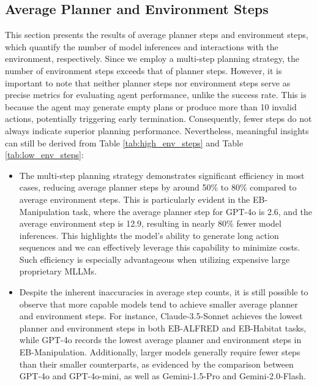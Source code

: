 \subsection{Average Planner and Environment Steps}\label{ap:planner_env_steps}
This section presents the results of average planner steps and environment steps, which quantify the number of model inferences and interactions with the environment, respectively. Since we employ a multi-step planning strategy, the number of environment steps exceeds that of planner steps. However, it is important to note that neither planner steps nor environment steps serve as precise metrics for evaluating agent performance, unlike the success rate. This is because the agent may generate empty plans or produce more than 10 invalid actions, potentially triggering early termination. Consequently, fewer steps do not always indicate superior planning performance. Nevertheless, meaningful insights can still be derived from Table \ref{tab:high_env_steps} and Table \ref{tab:low_env_steps}:
\begin{itemize}
    \item The multi-step planning strategy demonstrates significant efficiency in most cases, reducing average planner steps by around 50\% to 80\% compared to average environment steps. This is particularly evident in the EB-Manipulation task, where the average planner step for GPT-4o is 2.6, and the average environment step is 12.9, resulting in nearly 80\% fewer model inferences. This highlights the model's ability to generate long action sequences and we can effectively leverage this capability to minimize costs. Such efficiency is especially advantageous when utilizing expensive large proprietary MLLMs.
    \item Despite the inherent inaccuracies in average step counts, it is still possible to observe that more capable models tend to achieve smaller average planner and environment steps. For instance, Claude-3.5-Sonnet achieves the lowest planner and environment steps in both EB-ALFRED and EB-Habitat tasks, while GPT-4o records the lowest average planner and environment steps in EB-Manipulation. Additionally, larger models generally require fewer steps than their smaller counterparts, as evidenced by the comparison between GPT-4o and GPT-4o-mini, as well as Gemini-1.5-Pro and Gemini-2.0-Flash.
\end{itemize}




